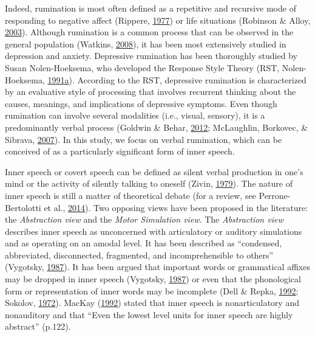 \documentclass[a4paper,12pt,twoside,openright,oldfontcommands]{memoir}
\begin{document}
Indeed, rumination is most often defined as a repetitive and recursive mode of responding to negative affect (Rippere, \protect\hyperlink{ref-Rippere1977}{1977}) or life situations (Robinson \& Alloy, \protect\hyperlink{ref-Robinson2003}{2003}). Although rumination is a common process that can be observed in the general population (Watkins, \protect\hyperlink{ref-Watkins2008}{2008}), it has been most extensively studied in depression and anxiety. Depressive rumination has been thoroughly studied by Susan Nolen-Hoeksema, who developed the Response Style Theory (RST, Nolen-Hoeksema, \protect\hyperlink{ref-nolen-hoeksema_responses_1991}{1991}\protect\hyperlink{ref-nolen-hoeksema_responses_1991}{a}). According to the RST, depressive rumination is characterized by an evaluative style of processing that involves recurrent thinking about the causes, meanings, and implications of depressive symptoms. Even though rumination can involve several modalities (i.e., visual, sensory), it is a predominantly verbal process (Goldwin \& Behar, \protect\hyperlink{ref-goldwin_concreteness_2012}{2012}; McLaughlin, Borkovec, \& Sibrava, \protect\hyperlink{ref-mclaughlin_effects_2007}{2007}). In this study, we focus on verbal rumination, which can be conceived of as a particularly significant form of inner speech.

Inner speech or covert speech can be defined as silent verbal production in one's mind or the activity of silently talking to oneself (Zivin, \protect\hyperlink{ref-zivin_development_1979}{1979}). The nature of inner speech is still a matter of theoretical debate (for a review, see Perrone-Bertolotti et al., \protect\hyperlink{ref-Perrone-Bertolotti2014}{2014}). Two opposing views have been proposed in the literature: the \emph{Abstraction view} and the \emph{Motor Simulation view}. The \emph{Abstraction view} describes inner speech as unconcerned with articulatory or auditory simulations and as operating on an amodal level. It has been described as \enquote{condensed, abbreviated, disconnected, fragmented, and incomprehensible to others} (Vygotsky, \protect\hyperlink{ref-vygotsky_collected_1987}{1987}). It has been argued that important words or grammatical affixes may be dropped in inner speech (Vygotsky, \protect\hyperlink{ref-vygotsky_collected_1987}{1987}) or even that the phonological form or representation of inner words may be incomplete (Dell \& Repka, \protect\hyperlink{ref-dell_errors_1992}{1992}; Sokolov, \protect\hyperlink{ref-sokolov_inner_1972}{1972}). MacKay (\protect\hyperlink{ref-mackay_constraints_1992}{1992}) stated that inner speech is nonarticulatory and nonauditory and that \enquote{Even the lowest level units for inner speech are highly abstract} (p.122).
\end{document}
